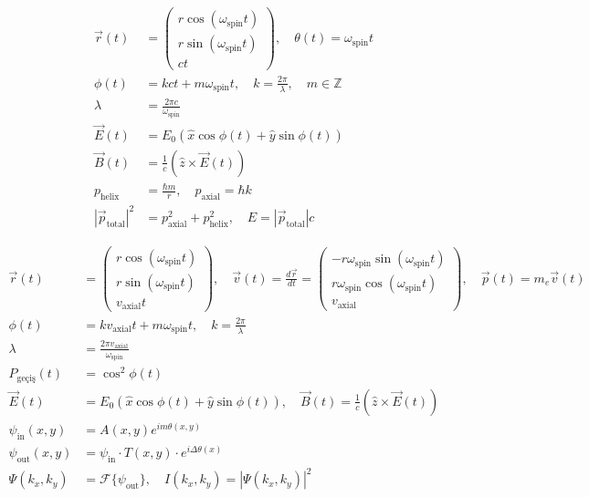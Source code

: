 \[
\boxed{
\begin{aligned}
\vec{r}(t) &= 
\begin{pmatrix}
r \cos(\omega_\text{spin} t) \\
r \sin(\omega_\text{spin} t) \\
c t
\end{pmatrix}, \quad
\theta(t) = \omega_\text{spin} t \\
\phi(t) &= k c t + m \omega_\text{spin} t, \quad
k = \frac{2\pi}{\lambda}, \quad m \in \mathbb{Z} \\
\lambda &= \frac{2\pi c}{\omega_\text{spin}} \\
\vec{E}(t) &= E_0 \left( \hat{x} \cos \phi(t) + \hat{y} \sin \phi(t) \right) \\
\vec{B}(t) &= \frac{1}{c} (\hat{z} \times \vec{E}(t)) \\
p_\text{helix} &= \frac{\hbar m}{r}, \quad
p_\text{axial} = \hbar k \\
|\vec{p}_\text{total}|^2 &= p_\text{axial}^2 + p_\text{helix}^2, \quad
E = |\vec{p}_\text{total}| c
\end{aligned}
}
\]

\[
\boxed{
\begin{aligned}
\vec{r}(t) &= 
\begin{pmatrix}
r \cos(\omega_\text{spin} t) \\
r \sin(\omega_\text{spin} t) \\
v_\text{axial} t
\end{pmatrix}, \quad
\vec{v}(t) = \frac{d\vec{r}}{dt} = 
\begin{pmatrix}
- r \omega_\text{spin} \sin(\omega_\text{spin} t) \\
r \omega_\text{spin} \cos(\omega_\text{spin} t) \\
v_\text{axial}
\end{pmatrix}, \quad
\vec{p}(t) = m_e \vec{v}(t) \\
\phi(t) &= k v_\text{axial} t + m \omega_\text{spin} t, \quad
k = \frac{2\pi}{\lambda} \\
\lambda &= \frac{2\pi v_\text{axial}}{\omega_\text{spin}} \\
P_\text{geçiş}(t) &= \cos^2 \phi(t) \\
\vec{E}(t) &= E_0 (\hat{x} \cos \phi(t) + \hat{y} \sin \phi(t)), \quad
\vec{B}(t) = \frac{1}{c} (\hat{z} \times \vec{E}(t)) \\
\psi_\text{in}(x,y) &= A(x,y) e^{i m \theta(x,y)} \\
\psi_\text{out}(x,y) &= \psi_\text{in} \cdot T(x,y) \cdot e^{i \Delta\theta(x)} \\
\Psi(k_x,k_y) &= \mathcal{F}\{\psi_\text{out}\}, \quad
I(k_x,k_y) = |\Psi(k_x,k_y)|^2
\end{aligned}
}
\]

